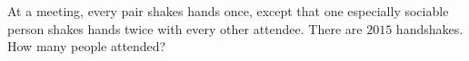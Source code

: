 At a meeting, every pair shakes hands once, except that one especially sociable person shakes hands twice with every other attendee. There are $2015$ handshakes. How many people attended?
